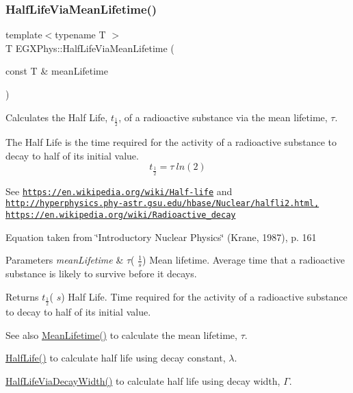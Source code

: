 \subsubsection{\texorpdfstring{Half\+Life\+Via\+Mean\+Lifetime()}{HalfLifeViaMeanLifetime()}}
{\footnotesize\ttfamily template$<$typename T $>$ \\
T E\+G\+X\+Phys\+::\+Half\+Life\+Via\+Mean\+Lifetime (\begin{DoxyParamCaption}\item[{const T \&}]{mean\+Lifetime }\end{DoxyParamCaption})}



Calculates the Half Life, $t_{\frac{1}{2}}$, of a radioactive substance via the mean lifetime, $\tau$. 

The Half Life is the time required for the activity of a radioactive substance to decay to half of its initial value. \[t_{\frac{1}{2}}= \tau \ ln(2)\]

See \href{https://en.wikipedia.org/wiki/Half-life}{\tt https\+://en.\+wikipedia.\+org/wiki/\+Half-\/life} and \href{http://hyperphysics.phy-astr.gsu.edu/hbase/Nuclear/halfli2.html,}{\tt http\+://hyperphysics.\+phy-\/astr.\+gsu.\+edu/hbase/\+Nuclear/halfli2.\+html,} \href{https://en.wikipedia.org/wiki/Radioactive_decay}{\tt https\+://en.\+wikipedia.\+org/wiki/\+Radioactive\+\_\+decay}

Equation taken from \char`\"{}\+Introductory Nuclear Physics\char`\"{} (Krane, 1987), p. 161


\begin{DoxyParams}{Parameters}
{\em mean\+Lifetime} & $\tau$( $\frac{1}{s}$) Mean lifetime. Average time that a radioactive substance is likely to survive before it decays. \\
\hline
\end{DoxyParams}
\begin{DoxyReturn}{Returns}
$t_{\frac{1}{2}}$( $s$) Half Life. Time required for the activity of a radioactive substance to decay to half of its initial value. 
\end{DoxyReturn}
\begin{DoxySeeAlso}{See also}
\hyperlink{group___atomic_gaa9e3c2deedda4bc7a745568b06fc47eb}{Mean\+Lifetime()} to calculate the mean lifetime, $\tau$. 

\hyperlink{group___half_life_ga21d268f154fb91c1c556bbfa7fe83ac1}{Half\+Life()} to calculate half life using decay constant, $\lambda$. 

\hyperlink{group___half_life_gaba3fda944d1a68ee1016a1f2f5809359}{Half\+Life\+Via\+Decay\+Width()} to calculate half life using decay width, $\Gamma$. 
\end{DoxySeeAlso}
